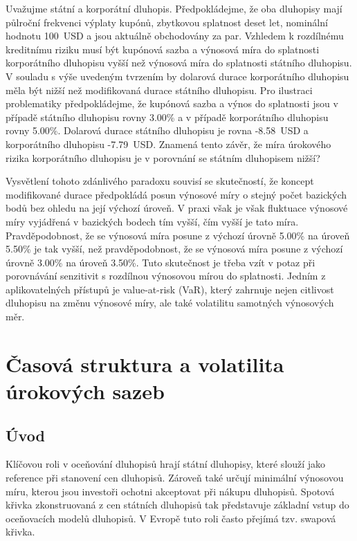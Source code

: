 \documentclass[a4paper]{book}
\begin{document}
Uvažujme státní a korporátní dluhopis. Předpokládejme, že oba dluhopisy mají půlroční frekvenci výplaty kupónů, zbytkovou splatnost deset let, nominální hodnotu 100~USD a jsou aktuálně obchodovány za par. Vzhledem k rozdílnému kreditnímu riziku musí být kupónová sazba a výnosová míra do splatnosti korporátního dluhopisu vyšší než výnosová míra do splatnosti státního dluhopisu. V souladu s výše uvedeným tvrzením by dolarová durace korporátního dluhopisu měla být nižší než modifikovaná durace státního dluhopisu. Pro ilustraci problematiky předpokládejme, že kupónová sazba a výnos do splatnosti jsou v případě státního dluhopisu rovny 3.00\% a v případě korporátního dluhopisu rovny 5.00\%. Dolarová durace státního dluhopisu je rovna -8.58~USD a korporátního dluhopisu -7.79~USD. Znamená tento závěr, že míra úrokového rizika korporátního dluhopisu je v porovnání se státním dluhopisem nižší?

Vysvětlení tohoto zdánlivého paradoxu souvisí se skutečností, že koncept modifikované durace předpokládá posun výnosové míry o stejný počet bazických bodů bez ohledu na její výchozí úroveň. V praxi však je však fluktuace výnosové míry vyjádřená v bazických bodech tím vyšší, čím vyšší je tato míra. Pravděpodobnost, že se výnosová míra posune z výchozí úrovně 5.00\% na úroveň 5.50\% je tak vyšší, než pravděpodobnost, že se výnosová míra posune z výchozí úrovně 3.00\% na úroveň 3.50\%. Tuto skutečnost je třeba vzít v potaz při porovnávání senzitivit s rozdílnou výnosovou mírou do splatnosti. Jedním z aplikovatelných přístupů je value-at-risk (VaR), který zahrnuje nejen citlivost dluhopisu na změnu výnosové míry, ale také volatilitu samotných výnosových měr.

\chapter{Časová struktura a volatilita úrokových sazeb}

\section{Úvod}

Klíčovou roli v oceňování dluhopisů hrají státní dluhopisy, které slouží jako reference při stanovení cen dluhopisů. Zároveň také určují minimální výnosovou míru, kterou jsou investoři ochotni akceptovat při nákupu dluhopisů. Spotová křivka zkonstruovaná z cen státních dluhopisů tak představuje základní vstup do oceňovacích modelů dluhopisů. V Evropě tuto roli často přejímá tzv. swapová křivka.
\end{document}
